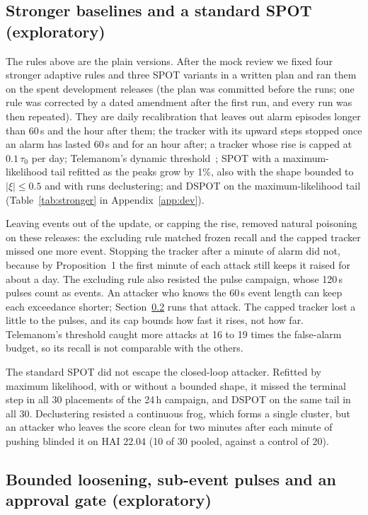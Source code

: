 \documentclass[letterpaper,twocolumn,10pt]{article}
\begin{document}
\subsection{Stronger baselines and a standard SPOT (exploratory)}
\label{sec:stronger}

The rules above are the plain versions. After the mock review we fixed four stronger adaptive rules and
three SPOT variants in a written plan and ran them on the spent development releases (the plan was
committed before the runs; one rule was corrected by a dated amendment after the first run, and every
run was then repeated). They are daily recalibration that leaves out alarm episodes longer than 60\,s and
the hour after them; the tracker with its upward steps stopped once an alarm has lasted 60\,s and for an
hour after; a tracker whose rise is capped at $0.1\,\tau_0$ per day; Telemanom's dynamic
threshold~\cite{hundman2018telemanom}; SPOT with a maximum-likelihood tail refitted as the peaks grow by
1\%, also with the shape bounded to $|\xi| \le 0.5$ and with runs declustering; and DSPOT on the
maximum-likelihood tail (Table~\ref{tab:stronger} in Appendix~\ref{app:dev}).


Leaving events out of the update, or capping the rise, removed natural poisoning on these releases: the excluding rule matched frozen recall and the capped tracker missed one more event. Stopping the tracker after a minute of alarm did not, because by
Proposition~1 the first minute of each attack still keeps it raised for about a day. The excluding rule
also resisted the pulse campaign, whose 120\,s pulses count as events. An attacker who knows the 60\,s
event length can keep each exceedance shorter; Section~\ref{sec:bounded} runs that attack. The capped tracker lost a little to the pulses, and
its cap bounds how fast it rises, not how far. Telemanom's threshold caught more attacks at 16 to 19 times
the false-alarm budget, so its recall is not comparable with the others.

The standard SPOT did not escape the closed-loop attacker. Refitted by maximum likelihood, with or without
a bounded shape, it missed the terminal step in all 30 placements of the 24\,h campaign, and DSPOT on the
same tail in all 30. Declustering resisted a continuous frog, which forms a single cluster, but an
attacker who leaves the score clean for two minutes after each minute of pushing blinded it on HAI 22.04
(10 of 30 pooled, against a control of 20).

\subsection{Bounded loosening, sub-event pulses and an approval gate (exploratory)}
\label{sec:bounded}
\end{document}
